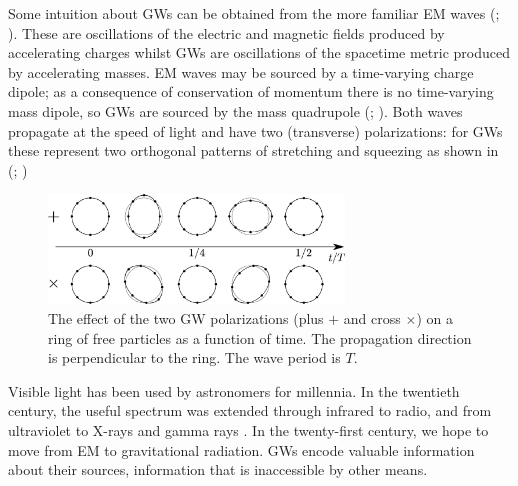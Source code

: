 Some intuition about GWs can be obtained from the more familiar EM waves (\citealt[sections 46--48, 66--67]{Landau1975}; \citealt[sections 7.1, 9.1--9.3]{Jackson1999}). These are oscillations of the electric and magnetic fields produced by accelerating charges whilst GWs are oscillations of the spacetime metric produced by accelerating masses. EM waves may be sourced by a time-varying charge dipole; as a consequence of conservation of momentum there is no time-varying mass dipole, so GWs are sourced by the mass quadrupole (\citealt[section 18.5]{Hobson2006}; \citealt[section 15.4]{Rindler2006}). Both waves propagate at the speed of light and have two (transverse) polarizations: for GWs these represent two orthogonal patterns of stretching and squeezing as shown in  (\citealt[section 34]{Dirac1996}; \citealt[section 18.4]{Hobson2006})
\begin{figure}
  \centering
  \includegraphics[width=0.7\textwidth]{./images/Polarization}
    \caption{The effect of the two GW polarizations (plus $+$ and cross $\times$) on a ring of free particles as a function of time. The propagation direction is perpendicular to the ring. The wave period is $T$.}   
    \label{fig:plus-cross} 
\end{figure}

Visible light has been used by astronomers for millennia. In the twentieth century, the useful spectrum was extended through infrared to radio, and from ultraviolet to X-rays and gamma rays \citep[chapter 7]{Longair2006}. In the twenty-first century, we hope to move from EM to gravitational radiation. GWs encode valuable information about their sources, information that is inaccessible by other means.

